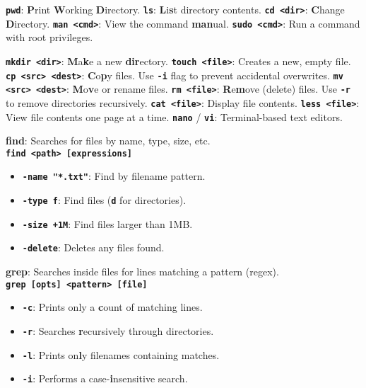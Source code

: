 \documentclass[10pt, a4paper]{article}
\newcommand{\cmd}[1]{\texttt{\textbf{#1}}}
\begin{document}
\pagestyle{empty} %

\begin{multicols}{3}
\footnotesize
\setlength{\parskip}{0pt}
\setlength{\parsep}{0pt}
\setlength{\itemsep}{0pt}
\setlength{\topsep}{0pt}


\cmd{pwd}: \textbf{P}rint \textbf{W}orking \textbf{D}irectory.
\cmd{ls}: \textbf{L}i\textbf{s}t directory contents.
\cmd{cd <dir>}: \textbf{C}hange \textbf{D}irectory.
\cmd{man <cmd>}: View the command \textbf{man}ual.
\cmd{sudo <cmd>}: Run a command with root privileges.

\cmd{mkdir <dir>}: \textbf{M}a\textbf{k}e a new \textbf{dir}ectory.
\cmd{touch <file>}: Creates a new, empty file.
\cmd{cp <src> <dest>}: \textbf{C}o\textbf{p}y files. Use \cmd{-i} flag to prevent accidental overwrites.
\cmd{mv <src> <dest>}: \textbf{M}o\textbf{v}e or rename files.
\cmd{rm <file>}: \textbf{R}e\textbf{m}ove (delete) files. Use \cmd{-r} to remove directories recursively.
\cmd{cat <file>}: Display file contents.
\cmd{less <file>}: View file contents one page at a time.
\cmd{nano} / \cmd{vi}: Terminal-based text editors.

\textbf{find}: Searches for files by name, type, size, etc. \\
\cmd{find <path> [expressions]}
\begin{itemize}[nosep] %
    \item \cmd{-name "*.txt"}: Find by filename pattern.
    \item \cmd{-type f}: Find files (\cmd{d} for directories).
    \item \cmd{-size +1M}: Find files larger than 1MB.
    \item \cmd{-delete}: Deletes any files found.
\end{itemize}

\vspace{1em} %

\textbf{grep}: Searches inside files for lines matching a pattern (regex). \\
\cmd{grep [opts] <pattern> [file]}
\begin{itemize}[nosep] %
    \item \cmd{-c}: Prints only a \textbf{c}ount of matching lines.
    \item \cmd{-r}: Searches \textbf{r}ecursively through directories.
    \item \cmd{-l}: Prints on\textbf{l}y filenames containing matches.
    \item \cmd{-i}: Performs a case-\textbf{i}nsensitive search.
\end{itemize}


\end{multicols}
\end{document}
